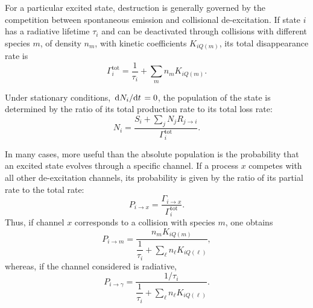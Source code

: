 \documentclass[12pt,a4paper]{article}
\begin{document}
For a particular excited state, destruction is generally governed by the competition between spontaneous emission and collisional de-excitation. If state $i$ has a radiative lifetime $\tau_i$ and can be deactivated through collisions with different species $m$, of density $n_m$, with kinetic coefficients $K_{iQ(m)}$, its total disappearance rate is
\begin{equation}
    \Gamma_i^{\text{tot}}
    =
    \frac{1}{\tau_i}
    +
    \sum_m n_m K_{iQ(m)}.
    \label{eq:total_loss_rate}
\end{equation}

Under stationary conditions, $\dv*{N_i}{t}=0$, the population of the state is determined by the ratio of its total production rate to its total loss rate:
\begin{equation}
    N_i
    =
    \frac{S_i + \sum_j N_j R_{j\to i}}
    {\Gamma_i^{\text{tot}}}.
    \label{eq:stationary_population}
\end{equation}

In many cases, more useful than the absolute population is the probability that an excited state evolves through a specific channel. If a process $x$ competes with all other de-excitation channels, its probability is given by the ratio of its partial rate to the total rate:
\begin{equation}
    P_{i\to x}
    =
    \frac{\Gamma_{i\to x}}
    {\Gamma_i^{\text{tot}}}.
    \label{eq:branching_ratio_general}
\end{equation}
Thus, if channel $x$ corresponds to a collision with species $m$, one obtains
\begin{equation}
    P_{i\to m}
    =
    \frac{n_m K_{iQ(m)}}
    {\dfrac{1}{\tau_i} + \sum_\ell n_\ell K_{iQ(\ell)}},
    \label{eq:branching_collision}
\end{equation}
whereas, if the channel considered is radiative,
\begin{equation}
    P_{i\to \gamma}
    =
    \frac{1/\tau_i}
    {\dfrac{1}{\tau_i} + \sum_\ell n_\ell K_{iQ(\ell)}}.
    \label{eq:branching_radiative}
\end{equation}
\end{document}

